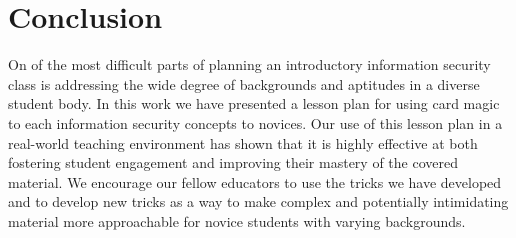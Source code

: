 \section{Conclusion}
\label{SEC:conclusion}

On of the most difficult parts of planning an introductory information security
class is addressing the wide degree of backgrounds and aptitudes in a diverse
student body.
In this work we have presented a lesson plan for using card magic to each
information security concepts to novices.  Our use of this lesson plan in a
real-world teaching environment has shown that it is highly effective at both
fostering student engagement and improving their mastery of the covered
material.
We encourage our fellow educators to use the tricks we have developed and to
develop new tricks as a way to make complex and potentially intimidating
material more approachable for novice students with varying backgrounds.
